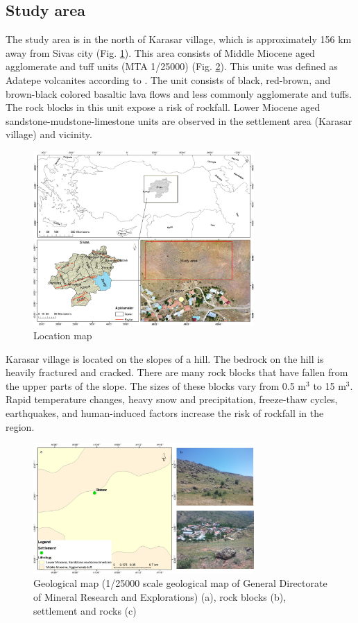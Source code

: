 \documentclass[a4paper,fleqn]{cas-sc}
\begin{document}
\subsection{Study area}
The study area is in the north of Karasar village, which is approximately 156 km away from Sivas city (Fig. \ref{fig:Figure1}). This area consists of Middle Miocene aged agglomerate and tuff units (MTA 1/25000) (Fig. \ref{fig:Figure2}). This unite was defined as Adatepe volcanites according to \cite{yilmaz2004divriugi}. The unit consists of black, red-brown, and brown-black colored basaltic lava flows and less commonly agglomerate and tuffs. The rock blocks in this unit expose a risk of rockfall. Lower Miocene aged sandstone-mudstone-limestone units are observed in the settlement area (Karasar village) and vicinity.
\begin{figure}
	\centering
	\includegraphics[width=0.75\textwidth]{fig1.jpg}
	\caption{ Location map}
	\label{fig:Figure1}
\end{figure}

Karasar village is located on the slopes of a hill. The bedrock on the hill is heavily fractured and cracked. There are many rock blocks that have fallen from the upper parts of the slope. The sizes of these blocks vary from 0.5 m$^3$ to 15 m$^3$. Rapid temperature changes, heavy snow and precipitation, freeze-thaw cycles, earthquakes, and human-induced factors increase the risk of rockfall in the region.
\begin{figure}[pos=h]
	\centering
	\includegraphics[width=0.75\textwidth]{fig2.jpg}
	\caption{ Geological map (1/25000 scale geological map of General Directorate of Mineral Research and Explorations) (a), rock blocks (b), settlement and rocks (c)}
	\label{fig:Figure2}
\end{figure}
\end{document}
